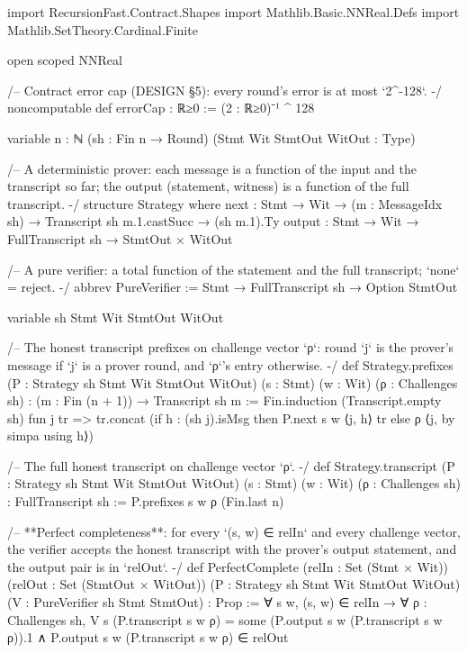\begin{leancode}[fontsize=\scriptsize,label={\footnotesize Contract/Security.lean}]
import RecursionFast.Contract.Shapes
import Mathlib.Basic.NNReal.Defs
import Mathlib.SetTheory.Cardinal.Finite

open scoped NNReal

/-- Contract error cap (DESIGN §5): every round's error is at most `2^-128`. -/
noncomputable def errorCap : ℝ≥0 := (2 : ℝ≥0)⁻¹ ^ 128

variable {n : ℕ} (sh : Fin n → Round) (Stmt Wit StmtOut WitOut : Type)

/-- A deterministic prover: each message is a function of the input and the transcript so far;
the output (statement, witness) is a function of the full transcript. -/
structure Strategy where
  next : Stmt → Wit → (m : MessageIdx sh) → Transcript sh m.1.castSucc → (sh m.1).Ty
  output : Stmt → Wit → FullTranscript sh → StmtOut × WitOut

/-- A pure verifier: a total function of the statement and the full transcript; `none` = reject. -/
abbrev PureVerifier := Stmt → FullTranscript sh → Option StmtOut

variable {sh Stmt Wit StmtOut WitOut}

/-- The honest transcript prefixes on challenge vector `ρ`: round `j` is the prover's message if
`j` is a prover round, and `ρ`'s entry otherwise. -/
def Strategy.prefixes (P : Strategy sh Stmt Wit StmtOut WitOut) (s : Stmt) (w : Wit)
    (ρ : Challenges sh) : (m : Fin (n + 1)) → Transcript sh m :=
  Fin.induction (Transcript.empty sh) fun j tr =>
    tr.concat (if h : (sh j).isMsg then P.next s w ⟨j, h⟩ tr else ρ ⟨j, by simpa using h⟩)

/-- The full honest transcript on challenge vector `ρ`. -/
def Strategy.transcript (P : Strategy sh Stmt Wit StmtOut WitOut) (s : Stmt) (w : Wit)
    (ρ : Challenges sh) : FullTranscript sh :=
  P.prefixes s w ρ (Fin.last n)

/-- **Perfect completeness**: for every `(s, w) ∈ relIn` and every challenge vector, the verifier
accepts the honest transcript with the prover's output statement, and the output pair is in
`relOut`. -/
def PerfectComplete (relIn : Set (Stmt × Wit)) (relOut : Set (StmtOut × WitOut))
    (P : Strategy sh Stmt Wit StmtOut WitOut) (V : PureVerifier sh Stmt StmtOut) : Prop :=
  ∀ s w, (s, w) ∈ relIn → ∀ ρ : Challenges sh,
    V s (P.transcript s w ρ) = some (P.output s w (P.transcript s w ρ)).1 ∧
      P.output s w (P.transcript s w ρ) ∈ relOut


\end{leancode}
